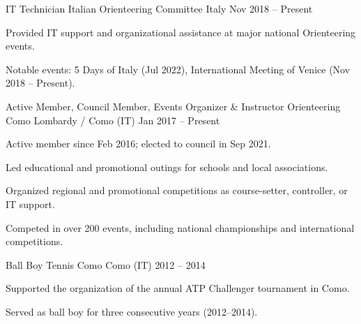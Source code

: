 
\begin{cventries}

    \cventry
    {IT Technician}
    {Italian Orienteering Committee}
    {Italy}
    {Nov 2018 -- Present}
    {
        \begin{cvitems}
            \item {Provided IT support and organizational assistance at major national Orienteering events.}
            \item {Notable events: 5 Days of Italy (Jul 2022), International Meeting of Venice (Nov 2018 -- Present).}
        \end{cvitems}
    }

    \cventry
    {Active Member, Council Member, Events Organizer \& Instructor}
    {Orienteering Como}
    {Lombardy / Como (IT)}
    {Jan 2017 -- Present}
    {
        \begin{cvitems}
            \item {Active member since Feb 2016; elected to council in Sep 2021.}
            \item {Led educational and promotional outings for schools and local associations.}
            \item {Organized regional and promotional competitions as course-setter, controller, or IT support.}
            \item {Competed in over 200 events, including national championships and international competitions.}
        \end{cvitems}
    }

    \cventry
    {Ball Boy}
    {Tennis Como}
    {Como (IT)}
    {2012 -- 2014}
    {
        \begin{cvitems}
            \item {Supported the organization of the annual ATP Challenger tournament in Como.}
            \item {Served as ball boy for three consecutive years (2012–2014).}
        \end{cvitems}
    }

\end{cventries}

